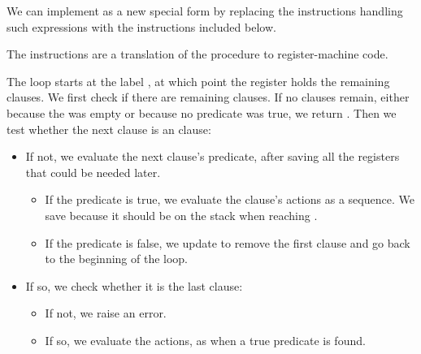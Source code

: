 \begin{exe}[5.24]
    We can implement  as a new special form by replacing the 
    instructions handling such expressions with the instructions included below.

    The instructions are a translation of the  procedure to 
    register-machine code.

    The loop starts at the label , at which point the 
     register holds the remaining clauses. We first check if there 
    are remaining clauses. If no clauses remain, either because the  
    was empty or because no predicate was true, we return . Then we 
    test whether the next clause is an  clause:
    \begin{itemize}
	\item If not, we evaluate the next clause’s predicate, after saving all 
	    the registers that could be needed later.
	    \begin{itemize}
		\item If the predicate is true, we evaluate the clause’s actions 
		    as a sequence. We save  because it should be 
		    on the stack when reaching .
		\item If the predicate is false, we update  to remove 
		    the first clause and go back to the beginning of the loop.
	    \end{itemize}
	\item If so, we check whether it is the last clause:
	    \begin{itemize}
		\item If not, we raise an error.
		\item If so, we evaluate the actions, as when a true predicate 
		    is found.
	    \end{itemize}
    \end{itemize}
\end{exe}

